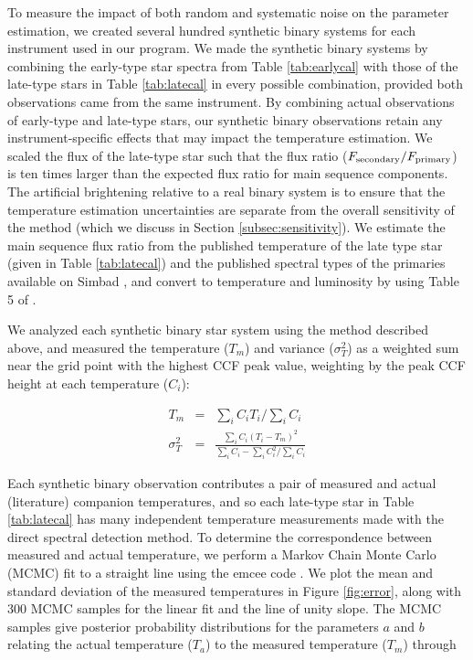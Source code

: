 \documentclass{emulateapj}
\begin{document}
To measure the impact of both random and systematic noise on the parameter estimation, we created several hundred synthetic binary systems for each instrument used in our program. We made the synthetic binary systems by combining the early-type star spectra from Table \ref{tab:earlycal} with those of the late-type stars in Table \ref{tab:latecal} in every possible combination, provided both observations came from the same instrument. By combining actual observations of early-type and late-type stars, our synthetic binary observations retain any instrument-specific effects that may impact the temperature estimation. We scaled the flux of the late-type star such that the flux ratio ($F_{\rm secondary}/F_{\rm primary}$) is ten times larger than the expected flux ratio for main sequence components. The artificial brightening relative to a real binary system is to ensure that the temperature estimation uncertainties are separate from the overall sensitivity of the method (which we discuss in Section \ref{subsec:sensitivity}). We estimate the main sequence flux ratio from the published temperature of the late type star (given in Table \ref{tab:latecal}) and the published spectral types of the primaries available on Simbad \citep{Simbad}, and convert to temperature and luminosity by using Table 5 of \citet{Pecaut2013}.


We analyzed each synthetic binary star system using the method described above, and measured the temperature ($T_m$) and variance ($\sigma_T^2$) as a weighted sum near the grid point with the highest CCF peak value, weighting by the peak CCF height at each temperature ($C_i$):

\begin{eqnarray}
\label{eqn:tmeas} 
T_m &=& \sum_i C_i T_i / \sum_i C_i \\
\sigma_T^2 &=& \frac{\sum_i C_i (T_i - T_m)^2}{ \sum_i C_i - \sum_i C_i^2 / \sum_i C_i}
\end{eqnarray}

Each synthetic binary observation contributes a pair of measured and actual (literature) companion temperatures, and so each late-type star in Table \ref{tab:latecal} has many independent temperature measurements made with the direct spectral detection method. To determine the correspondence between measured and actual temperature, we perform a Markov Chain Monte Carlo (MCMC) fit to a straight line using the emcee code \citep{emcee}. We plot the mean and standard deviation of the measured temperatures in Figure \ref{fig:error}, along with 300 MCMC samples for the linear fit and the line of unity slope. The MCMC samples give posterior probability distributions for the parameters $a$ and $b$ relating the actual temperature ($T_a$) to the measured temperature ($T_m$) through
\end{document}
